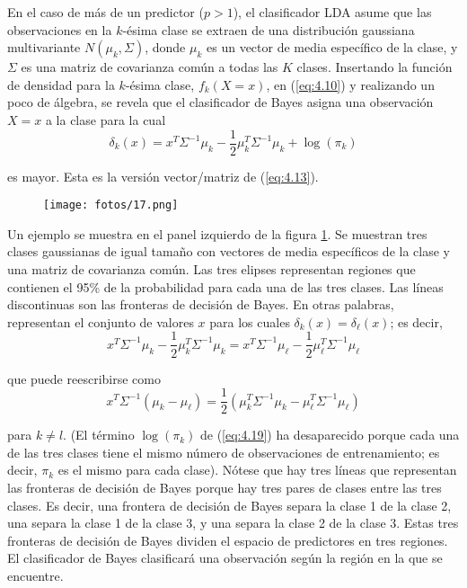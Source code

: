 En el caso de más de un predictor ($p > 1$), el clasificador LDA asume que las observaciones en la $k$-ésima clase se extraen de una distribución gaussiana multivariante $N(\mu_k, \Sigma)$, donde $\mu_k$ es un vector de media específico de la clase, y $\Sigma$ es una matriz de covarianza común a todas las $K$ clases. Insertando la función de densidad para la $k$-ésima clase, $f_k(X = x)$, en (\ref{eq:4.10}) y realizando un poco de álgebra, se revela que el clasificador de Bayes asigna una observación $X = x$ a la clase para la cual
\begin{equation}
\delta_k(x) = x^T \Sigma^{-1} \mu_k - \frac{1}{2} \mu_k^T \Sigma^{-1} \mu_k + \log(\pi_k)
\label{eq:4.19}
\end{equation}

\noindent es mayor. Esta es la versión vector/matriz de (\ref{eq:4.13}). \\

\begin{figure}[h]
\centering
\texttt{[image: fotos/17.png]}
\caption{}
\label{fig:4.6}
\end{figure}

Un ejemplo se muestra en el panel izquierdo de la figura \ref{fig:4.6}. Se muestran tres clases gaussianas de igual tamaño con vectores de media específicos de la clase y una matriz de covarianza común. Las tres elipses representan regiones que contienen el 95\% de la probabilidad para cada una de las tres clases. Las líneas discontinuas son las fronteras de decisión de Bayes. En otras palabras, representan el conjunto de valores $x$ para los cuales $\delta_k(x) = \delta_\ell(x)$; es decir,
\begin{equation}
x^T \Sigma^{-1} \mu_k - \frac{1}{2} \mu_k^T \Sigma^{-1} \mu_k = x^T \Sigma^{-1} \mu_\ell - \frac{1}{2} \mu_\ell^T \Sigma^{-1} \mu_\ell
\label{eq:4.20}
\end{equation}

\noindent que puede reescribirse como
\begin{equation}
x^T \Sigma^{-1} (\mu_k - \mu_\ell) = \frac{1}{2} (\mu_k^T \Sigma^{-1} \mu_k - \mu_\ell^T \Sigma^{-1} \mu_\ell)
\label{eq:4.20.1}
\end{equation}

para $k \neq l$. (El término $\log(\pi_k)$ de (\ref{eq:4.19}) ha desaparecido porque cada una de las tres clases tiene el mismo número de observaciones de entrenamiento; es decir, $\pi_k$ es el mismo para cada clase). Nótese que hay tres líneas que representan las fronteras de decisión de Bayes porque hay tres pares de clases entre las tres clases. Es decir, una frontera de decisión de Bayes separa la clase 1 de la clase 2, una separa la clase 1 de la clase 3, y una separa la clase 2 de la clase 3. Estas tres fronteras de decisión de Bayes dividen el espacio de predictores en tres regiones. El clasificador de Bayes clasificará una observación según la región en la que se encuentre. \\

